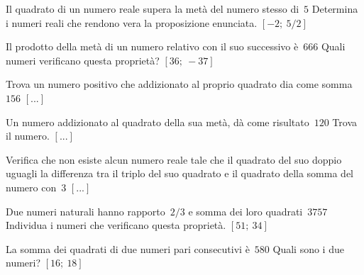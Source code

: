 \begin{multicols}{2}



\begin{esercizio}[\Ast]
 \label{ese:3.112}
Il quadrato di un numero reale supera la metà del numero stesso di~$5$
Determina i numeri reali che rendono vera la proposizione enunciata.
\hfill$\left[-2;~5/2\right]$
\end{esercizio}

\begin{esercizio}[\Ast]
 \label{ese:3.113}
Il prodotto della metà di un numero relativo con il suo successivo è~$666$
Quali numeri verificano questa proprietà?
\hfill$\left[36;~-37\right]$
\end{esercizio}

\begin{esercizio}
 \label{ese:3.114}
Trova un numero positivo che addizionato al proprio quadrato dia come 
somma~$156$
\hfill$\left[...\right]$
\end{esercizio}

\begin{esercizio}
 \label{ese:3.115}
Un numero addizionato al quadrato della sua metà, dà come risultato~$120$
Trova il numero.
\hfill$\left[...\right]$
\end{esercizio}

\begin{esercizio}
 \label{ese:3.116}
Verifica che non esiste alcun numero reale tale che il quadrato del suo
doppio uguagli la differenza tra il triplo del suo quadrato e il quadrato
della somma del numero con~$3$
\hfill$\left[...\right]$
\end{esercizio}

\begin{esercizio}[\Ast]
 \label{ese:3.117}
Due numeri naturali hanno rapporto~$2/3$ e somma dei loro quadrati~$3757$
Individua i numeri che verificano questa proprietà.
\hfill$\left[51;~34\right]$
\end{esercizio}

\begin{esercizio}[\Ast]
 \label{ese:3.118}
La somma dei quadrati di due numeri pari consecutivi è~$580$ Quali sono i
due numeri?
\hfill$\left[16;~18\right]$
\end{esercizio}


\end{multicols}
